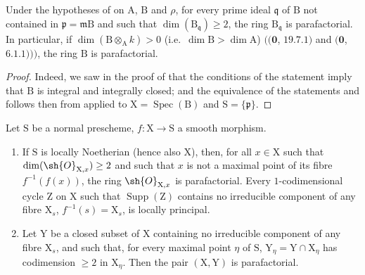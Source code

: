 \begin{corollary}[21.14.2]
\label{IV.21.14.2}
Under the hypotheses of  on $\mathrm{A}$, $\mathrm{B}$ and $\rho$, for every prime ideal $\mathfrak{q}$ of $\mathrm{B}$ not contained in $\mathfrak{p}=\mathfrak{m}\mathrm{B}$ and such that $\dim(\mathrm{B}_{\mathfrak{q}})\geq 2$, the ring $\mathrm{B}_{\mathfrak{q}}$ is parafactorial.
In particular, if $\dim(\mathrm{B}\otimes_{\mathrm{A}}k)>0$ (i.e.\ $\dim\mathrm{B}>\dim\mathrm{A}$) $((\mathbf{0}$, $19.7.1)$ and $(\mathbf{0}$, $6.1.1)))$, the ring $\mathrm{B}$ is parafactorial.
\end{corollary}

\begin{proof}
Indeed, we saw in the proof of  that the conditions of the statement imply that $\mathrm{B}$ is integral and integrally closed; and the equivalence of the statements  and  follows then from  applied to $\mathrm{X}=\operatorname{Spec}(\mathrm{B})$ and $\mathrm{S}=\{\mathfrak{p}\}$.
\end{proof}

\begin{proposition}[21.14.3]
\label{IV.21.14.3}
Let $\mathrm{S}$ be a normal prescheme, $f:\mathrm{X}\to\mathrm{S}$ a smooth morphism.
\begin{enumerate}[label=(\roman*)]
  \item If $\mathrm{S}$ is locally Noetherian (hence also $\mathrm{X}$), then, for all $x\in\mathrm{X}$ such that $\dim(\sh{O}_{\mathrm{X},x})\geq 2$ and such that $x$ is not a maximal point of its fibre $f^{-1}(f(x))$, the ring $\sh{O}_{\mathrm{X},x}$ is parafactorial.
  Every $1$-codimensional cycle $\mathrm{Z}$ on $\mathrm{X}$ such that $\operatorname{Supp}(\mathrm{Z})$ contains no irreducible component of any fibre $\mathrm{X}_s$, $f^{-1}(s)=\mathrm{X}_s$, is locally principal.
  \item Let $\mathrm{Y}$ be a closed subset of $\mathrm{X}$ containing no irreducible component of any fibre $\mathrm{X}_s$, and such that, for every maximal point $\eta$ of $\mathrm{S}$, $\mathrm{Y}_\eta=\mathrm{Y}\cap\mathrm{X}_\eta$ has codimension $\geq 2$ in $\mathrm{X}_\eta$.
  Then the pair $(\mathrm{X},\mathrm{Y})$ is parafactorial.
\end{enumerate}
\end{proposition}

